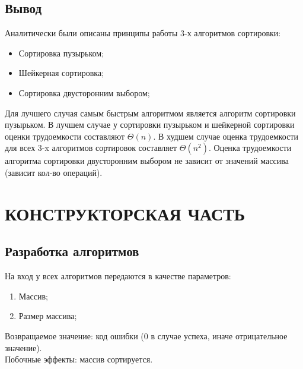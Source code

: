 \documentclass[a4paper,12pt]{article}
\begin{document}
\newpage
\subsection{Вывод}
Аналитически были описаны принципы работы 3-х алгоритмов сортировки:
\begin{itemize}
\item Сортировка пузырьком;
\item Шейкерная сортировка;
\item Сортировка двусторонним выбором; 
\end{itemize}
Для лучшего случая самым быстрым алгоритмом является алгоритм сортировки пузырьком. В лучшем случае у сортировки пузырьком и шейкерной сортировки оценки трудоемкости составляют $\Theta(n)$. В худшем случае оценка трудоемкости для всех 3-x алгоритмов сортировок составляет $\Theta(n^2)$. Оценка трудоемкости алгоритма сортировки двусторонним выбором не зависит от значений массива (зависит кол-во операций).


\newpage
\section{КОНСТРУКТОРСКАЯ ЧАСТЬ}

\subsection{Разработка алгоритмов}
На вход у всех алгоритмов передаются в качестве параметров:
\begin{enumerate}
\item Массив;
\item Размер массива;
\end{enumerate}
Возвращаемое значение: код ошибки (0 в случае успеха, иначе отрицательное значение). \\
Побочные эффекты: массив сортируется.

\newpage
\end{document}
